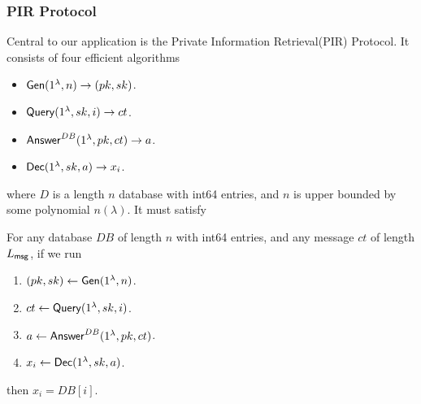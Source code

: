 \subsubsection{PIR Protocol}
Central to our application is the Private Information Retrieval(PIR) Protocol. It consists of four efficient algorithms
\begin{itemize}
    \item $\mathsf{Gen}(1^{\lambda}, n) \to (pk, sk)$.
    \item $\mathsf{Query}(1^{\lambda}, sk, i) \to ct$.
    \item $\mathsf{Answer}^{DB}(1^{\lambda}, pk, ct) \to a$.
    \item $\mathsf{Dec}(1^{\lambda}, sk, a) \to x_i$.
\end{itemize}
where $D$ is a length $n$ database with int64 entries, and $n$ is upper bounded by some polynomial $n(\lambda)$. It must satisfy
\begin{definition}[Correctness]
For any database $DB$ of length $n$ with int64 entries, and any message $ct$ of length $L_{\mathsf{msg}}$, if we run
\begin{enumerate}
    \item $(pk, sk) \leftarrow \mathsf{Gen}(1^{\lambda}, n)$.
    \item $ct \leftarrow \mathsf{Query}(1^{\lambda}, sk, i)$.
    \item $a \leftarrow \mathsf{Answer}^{DB}(1^{\lambda}, pk, ct)$.
    \item $x_i \leftarrow \mathsf{Dec}(1^{\lambda}, sk, a)$.
\end{enumerate}
then $x_i = DB[i]$.
\end{definition}
